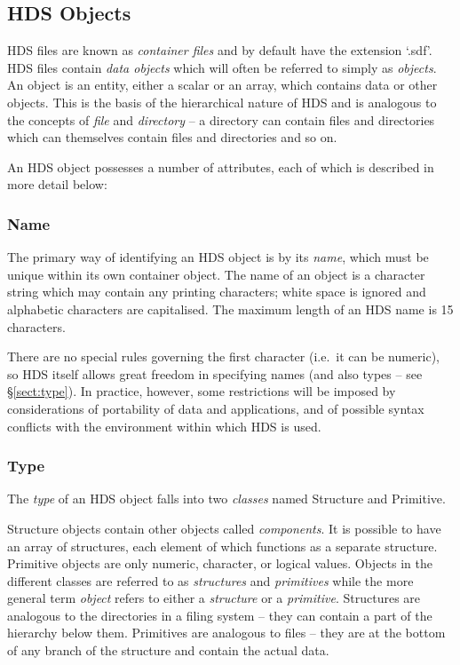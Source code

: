 \documentclass[final,authoryear,5p,times,twocolumn]{elsarticle}
\begin{document}
\subsection{\label{sect:objects}HDS Objects}

HDS files are known as \emph{container files} and by default have the
extension `.sdf'.  HDS files contain \emph{data objects} which will
often be referred to simply as \emph{objects}. An object is an entity,
either a scalar or an array,
which contains data or other objects. This is the basis of the
hierarchical nature of HDS and is analogous to the concepts of
\emph{file} and \emph{directory} -- a directory can contain files and
directories which can themselves contain files and directories and so
on.

An HDS object possesses a number of attributes, each of which is
described in more detail below:

\subsubsection{\label{sect:name}Name}

The primary way of identifying an HDS object is by its \emph{name},
which must be unique within its own container object.  The name of an
object is a character string which may contain any printing
characters; white space is ignored and alphabetic characters are
capitalised. The maximum length of an HDS name is 15 characters.

There are no special rules governing the first character
(i.e.\ it can be numeric), so HDS itself allows great freedom in specifying
names (and also types -- see \S\ref{sect:type}). In practice,
however, some restrictions will be imposed by considerations of
portability of data and applications, and of possible syntax conflicts
with the environment within which HDS is used.

\subsubsection{\label{sect:type}Type}

The \emph{type} of an HDS object falls into two \emph{classes} named
Structure and Primitive.

Structure objects contain other objects called
\emph{components}. It is possible to have an array of structures,
each element of which functions as a separate structure.
Primitive objects are only numeric, character,
or logical values. Objects in the different classes are referred to as
\emph{structures} and \emph{primitives} while the more general term
\emph{object} refers to either a \emph{structure} or a
\emph{primitive}. Structures are analogous to the directories in a
filing system -- they can contain a part of the hierarchy below
them. Primitives are analogous to files -- they are at the bottom of
any branch of the structure and contain the actual data.
\end{document}
